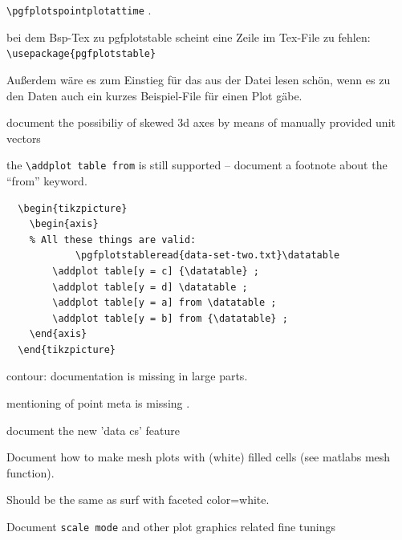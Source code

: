 \documentclass[a4paper]{article}
\begin{document}
\begin{bugtracker}
\begin{doctodo}[+]
	\verb|\pgfplotspointplotattime| .
\end{doctodo}

\begin{doctodo}
	bei dem Bsp-Tex zu pgfplotstable scheint eine Zeile im Tex-File zu fehlen:
\verb|\usepackage{pgfplotstable}|

Außerdem wäre es zum Einstieg für das aus der Datei lesen schön, wenn es
zu den Daten auch ein kurzes Beispiel-File für einen Plot gäbe.
\end{doctodo}

\begin{doctodo}[+]
document the possibiliy of skewed 3d axes by means of manually provided unit vectors
\end{doctodo}


\begin{doctodo}[+]
	the \verb|\addplot table from| is still supported -- document a footnote about the ``from'' keyword.
\begin{verbatim}
  \begin{tikzpicture}
    \begin{axis}
	% All these things are valid:
            \pgfplotstableread{data-set-two.txt}\datatable
        \addplot table[y = c] {\datatable} ;
        \addplot table[y = d] \datatable ;
        \addplot table[y = a] from \datatable ;
        \addplot table[y = b] from {\datatable} ;
    \end{axis}
  \end{tikzpicture}
\end{verbatim}
\end{doctodo}

\begin{doctodo}[+]
	contour: documentation is missing in large parts.
	
	mentioning of point meta is missing .
\end{doctodo}

\begin{doctodo}
	document the new 'data cs' feature
\end{doctodo}

\begin{doctodo}[+]
	Document how to make mesh plots with (white) filled cells (see matlabs mesh function).

	Should be the same as surf with faceted color=white.
\end{doctodo}

\begin{doctodo}[+]
	Document \verb|scale mode| and other plot graphics related fine tunings
\end{doctodo}


\end{bugtracker}
\end{document}
